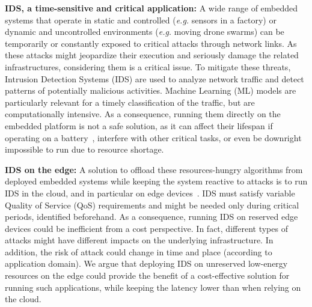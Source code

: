 

\textbf{IDS, a time-sensitive and critical application:} 
A wide range of embedded systems that operate in static and controlled (\textit{e.g.} sensors in a factory) or dynamic and uncontrolled environments (\textit{e.g.} moving drone swarms) can be temporarily or constantly exposed to critical attacks through network links. As these attacks might jeopardize their execution and seriously damage the related infrastructures, considering them is a critical issue. To mitigate these threats, Intrusion Detection Systems (IDS) are used to analyze network traffic and detect patterns of potentially malicious activities. Machine Learning (ML) models are particularly relevant for a timely classification of the traffic, but are computationally intensive. As a consequence, running them directly on the embedded platform is not a safe solution, as it can affect their lifespan if operating on a battery~\cite{slimani:hal-04159551}, interfere with other critical tasks, or even be downright impossible to run due to resource shortage.

\textbf{IDS on the edge:} A solution to offload these resources-hungry algorithms from deployed embedded systems while keeping the system reactive to attacks is to run IDS in the cloud, and in particular on edge devices~\cite{eskandari2020}. IDS must satisfy variable Quality of Service (QoS) requirements and might be needed only during critical periods, identified beforehand. As a consequence, running IDS on reserved edge devices could be inefficient from a cost perspective. In fact, different types of attacks might have different impacts on the underlying infrastructure. In addition, the risk of attack could change in time and place (according to application domain). We argue that deploying IDS on unreserved low-energy resources on the edge could provide the benefit of a cost-effective solution for running such applications, while keeping the latency lower than when relying on the cloud. %

